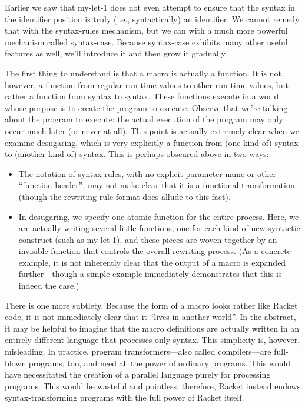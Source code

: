 
Earlier we saw that my-let-1 does not even attempt to ensure that the syntax in
the identifier position is truly (i.e., syntactically) an identifier. We cannot
remedy that with the syntax-rules mechanism, but we can with a much more
powerful mechanism called syntax-case. Because syntax-case exhibits many other
useful features as well, we’ll introduce it and then grow it gradually.

The first thing to understand is that a macro is actually a function. It is not,
however, a function from regular run-time values to other run-time values, but
rather a function from syntax to syntax. These functions execute in a world
whose purpose is to create the program to execute. Observe that we’re talking
about the program to execute: the actual execution of the program may only occur
much later (or never at all). This point is actually extremely clear when we
examine desugaring, which is very explicitly a function from (one kind of)
syntax to (another kind of) syntax. This is perhaps obscured above in two ways:
\begin{itemize}
  \item 
The notation of syntax-rules, with no explicit parameter name or other “function
header”, may not make clear that it is a functional transformation (though the
rewriting rule format does allude to this fact).
  \item 
In desugaring, we specify one atomic function for the entire process. Here, we
are actually writing several little functions, one for each kind of new
syntactic construct (such as my-let-1), and these pieces are woven together by
an invisible function that controls the overall rewriting process. (As a
concrete example, it is not inherently clear that the output of a macro is
expanded further—though a simple example immediately demonstrates that this is
indeed the case.)
\end{itemize}


There is one more subtlety. Because the form of a macro looks rather like Racket
code, it is not immediately clear that it “lives in another world”. In the
abstract, it may be helpful to imagine that the macro definitions are actually
written in an entirely different language that processes only syntax. This
simplicity is, however, misleading. In practice, program transformers—also
called compilers—are full-blown programs, too, and need all the power of
ordinary programs. This would have necessitated the creation of a parallel
language purely for processing programs. This would be wasteful and pointless;
therefore, Racket instead endows syntax-transforming programs with the full
power of Racket itself.

